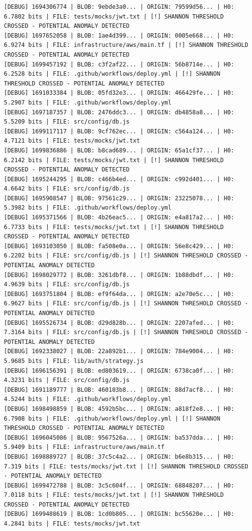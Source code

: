 \documentclass[12pt, a4paper, oneside]{report}
\begin{document}
\begin{lstlisting}[basicstyle=\tiny\ttfamily]
[DEBUG] 1694306774 | BLOB: 9ebde3a0... | ORIGIN: 79599d56... | H0: 6.7802 bits | FILE: tests/mocks/jwt.txt | [!] SHANNON THRESHOLD CROSSED - POTENTIAL ANOMALY DETECTED
[DEBUG] 1697652058 | BLOB: 1ae4d399... | ORIGIN: 0005e668... | H0: 6.9274 bits | FILE: infrastructure/aws/main.tf | [!] SHANNON THRESHOLD CROSSED - POTENTIAL ANOMALY DETECTED
[DEBUG] 1699457192 | BLOB: c3f2af22... | ORIGIN: 56b8714e... | H0: 6.2528 bits | FILE: .github/workflows/deploy.yml | [!] SHANNON THRESHOLD CROSSED - POTENTIAL ANOMALY DETECTED
[DEBUG] 1691033384 | BLOB: 05fd32e3... | ORIGIN: 466429fe... | H0: 5.2907 bits | FILE: .github/workflows/deploy.yml
[DEBUG] 1697187357 | BLOB: 2476ddc3... | ORIGIN: db4858a8... | H0: 5.5209 bits | FILE: src/config/db.js
[DEBUG] 1699117117 | BLOB: 9cf762ec... | ORIGIN: c564a124... | H0: 4.7121 bits | FILE: tests/mocks/jwt.txt
[DEBUG] 1699836886 | BLOB: b8cad689... | ORIGIN: 65a1cf37... | H0: 6.2142 bits | FILE: tests/mocks/jwt.txt | [!] SHANNON THRESHOLD CROSSED - POTENTIAL ANOMALY DETECTED
[DEBUG] 1695244295 | BLOB: c466b4ed... | ORIGIN: c992d401... | H0: 4.6642 bits | FILE: src/config/db.js
[DEBUG] 1695908547 | BLOB: 97561c29... | ORIGIN: 23225078... | H0: 5.3982 bits | FILE: .github/workflows/deploy.yml
[DEBUG] 1695371566 | BLOB: 4b26eac5... | ORIGIN: e4a817a2... | H0: 6.7733 bits | FILE: tests/mocks/jwt.txt | [!] SHANNON THRESHOLD CROSSED - POTENTIAL ANOMALY DETECTED
[DEBUG] 1693103050 | BLOB: fa508e0a... | ORIGIN: 56e8c429... | H0: 6.2202 bits | FILE: src/config/db.js | [!] SHANNON THRESHOLD CROSSED - POTENTIAL ANOMALY DETECTED
[DEBUG] 1698029772 | BLOB: 3261dbf8... | ORIGIN: 1b88dbdf... | H0: 4.9639 bits | FILE: src/config/db.js
[DEBUG] 1693751804 | BLOB: ef9f64da... | ORIGIN: a2e70e5c... | H0: 6.9627 bits | FILE: src/config/db.js | [!] SHANNON THRESHOLD CROSSED - POTENTIAL ANOMALY DETECTED
[DEBUG] 1695526734 | BLOB: d29d828b... | ORIGIN: 2207afed... | H0: 7.3164 bits | FILE: src/config/db.js | [!] SHANNON THRESHOLD CROSSED - POTENTIAL ANOMALY DETECTED
[DEBUG] 1692338027 | BLOB: 22a892b1... | ORIGIN: 784e9004... | H0: 5.9685 bits | FILE: lib/auth/strategy.js
[DEBUG] 1696156391 | BLOB: ed803619... | ORIGIN: 6738ca0f... | H0: 4.3231 bits | FILE: src/config/db.js
[DEBUG] 1691189777 | BLOB: 460103b8... | ORIGIN: 88d7acf8... | H0: 4.5244 bits | FILE: .github/workflows/deploy.yml
[DEBUG] 1698498859 | BLOB: 4592b5bc... | ORIGIN: a818f2e8... | H0: 6.7908 bits | FILE: .github/workflows/deploy.yml | [!] SHANNON THRESHOLD CROSSED - POTENTIAL ANOMALY DETECTED
[DEBUG] 1696045086 | BLOB: 9567526a... | ORIGIN: ba537dda... | H0: 5.9409 bits | FILE: infrastructure/aws/main.tf
[DEBUG] 1698889727 | BLOB: 37c5c4a2... | ORIGIN: b6e8b315... | H0: 7.319 bits | FILE: tests/mocks/jwt.txt | [!] SHANNON THRESHOLD CROSSED - POTENTIAL ANOMALY DETECTED
[DEBUG] 1699472788 | BLOB: 3c5c604f... | ORIGIN: 68848207... | H0: 7.0118 bits | FILE: tests/mocks/jwt.txt | [!] SHANNON THRESHOLD CROSSED - POTENTIAL ANOMALY DETECTED
[DEBUG] 1699488619 | BLOB: 1cd0b805... | ORIGIN: bc55620e... | H0: 4.2841 bits | FILE: tests/mocks/jwt.txt
\end{lstlisting}
\end{document}
